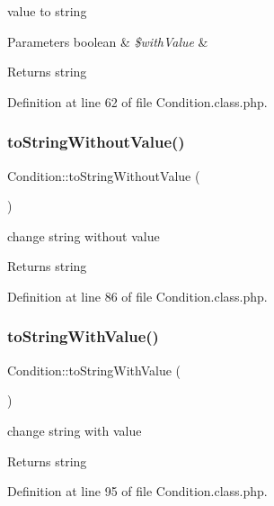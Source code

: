 value to string 
\begin{DoxyParams}[1]{Parameters}
boolean & {\em \$with\+Value} & \\
\hline
\end{DoxyParams}
\begin{DoxyReturn}{Returns}
string 
\end{DoxyReturn}


Definition at line 62 of file Condition.\+class.\+php.

\mbox{\label{classCondition_ae472caca5533fe0442eb56fe38cc8ef1}} 
\subsubsection{\texorpdfstring{to\+String\+Without\+Value()}{toStringWithoutValue()}}
{\footnotesize\ttfamily Condition\+::to\+String\+Without\+Value (\begin{DoxyParamCaption}{ }\end{DoxyParamCaption})}

change string without value \begin{DoxyReturn}{Returns}
string 
\end{DoxyReturn}


Definition at line 86 of file Condition.\+class.\+php.

\mbox{\label{classCondition_ac15dfd53b971b98fd34b7cfff99ab4c8}} 
\subsubsection{\texorpdfstring{to\+String\+With\+Value()}{toStringWithValue()}}
{\footnotesize\ttfamily Condition\+::to\+String\+With\+Value (\begin{DoxyParamCaption}{ }\end{DoxyParamCaption})}

change string with value \begin{DoxyReturn}{Returns}
string 
\end{DoxyReturn}


Definition at line 95 of file Condition.\+class.\+php.



